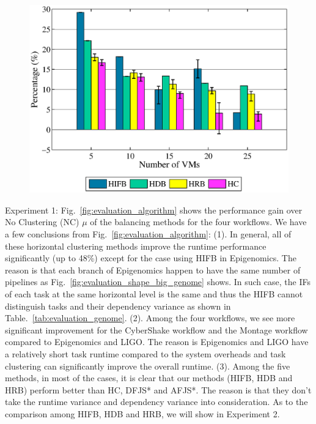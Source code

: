 \begin{figure}[!htb]
	\centering
	\includegraphics[width=1.0\linewidth]{figures/evaluation/resource2.eps}
	\label{fig:evaluation_resource_2}
\end{figure}
Experiment 1: Fig.~\ref{fig:evaluation_algorithm}  shows the performance gain over No Clustering (NC) $\mu$ of the balancing methods for the four workflows. We have a few conclusions from Fig.~\ref{fig:evaluation_algorithm}: (1). In general, all of these horizontal clustering methods improve the runtime performance significantly (up to 48\%) except for the case using HIFB in Epigenomics. The reason is that each branch of Epigenomics happen to have the same number of pipelines as Fig.~\ref{fig:evaluation_shape_big_genome} shows. In such case, the IFs of each task at the same horizontal level is the same and thus the HIFB cannot distinguish tasks and their dependency variance as shown in Table.~\ref{tab:evaluation_genome}. 
(2). Among the four workflows, we see more significant improvement for the CyberShake workflow and the Montage workflow compared to Epigenomics and LIGO. The reason is Epigenomics and LIGO have a relatively short task runtime compared to the system overheads and task clustering can significantly improve the overall runtime. 
(3). Among the five methods, in most of the cases, it is clear that our methods (HIFB, HDB and HRB) perform better than HC, DFJS* and AFJS*. The reason is that they don't take the runtime variance and dependency variance into consideration. As to the comparison among HIFB, HDB and HRB, we will show in Experiment 2. 

